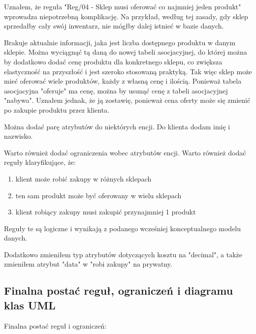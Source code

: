 \documentclass[a4paper,12pt]{article}
\begin{document}
Uznałem, że reguła "Reg/04 - Sklep musi oferować co najmniej jeden produkt" wprowadza niepotrzebną komplikację. Na przykład, według tej zasady, gdy sklep sprzedałby cały swój inwentarz, nie mógłby dalej istnieć w bazie danych.

Brakuje aktualnie informacji, jaka jest liczba dostępnego produktu w danym sklepie. Można wyciągnąć tą daną do nowej tabeli asocjacyjnej, do której można by dodatkowo dodać cenę produktu dla konkretnego sklepu, co zwiększa elastyczność na przyszłość i jest szeroko stosowaną praktyką. Tak więc sklep może mieć oferować wiele produktów, każdy z własną cenę i ilością. Ponieważ tabela asocjacyjna "oferuje" ma cenę, można by usunąć cenę z tabeli asocjacyjnej "nabywa". Uznałem jednak, że ją zostawię, ponieważ cena oferty może się zmienić po zakupie produktu przez klienta.

Można dodać parę atrybutów do niektórych encji. Do klienta dodam imię i nazwisko.

Warto również dodać ograniczenia wobec atrybutów encji. Warto również dodać reguły klaryfikujące, że:

\begin{enumerate}
    \item klient może robić zakupy w różnych sklepach
    \item ten sam produkt może być oferowany w wielu sklepach
    \item klient robiący zakupy musi zakupić przynajmniej 1 produkt
\end{enumerate}

Reguły te są logiczne i wynikają z podanego wcześniej konceptualnego modelu danych.

Dodatkowo zmieniłem typ atrybutów dotyczących kosztu na "decimal", a także zmieniłem atrybut "data" w "robi zakupy" na prywatny.

\subsection{Finalna postać reguł, ograniczeń i diagramu klas UML}

Finalna postać reguł i ograniczeń:
\end{document}
